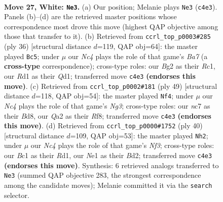 \documentclass[11pt]{article}
\begin{document}
\clearpage

\begin{figure}[p]\centering
\begin{subfigure}{0.46\textwidth}\centering
\resizebox{\linewidth}{!}{%
\newchessgame
\chessboard[
  setfen={1r1q2k1/p1n2rn1/b4bpp/2pp1p2/P1N2P2/1P4P1/Q3P1BP/1RBRN1K1 w - - 10 27},
  showmover=false,
  pgfstyle=straightmove, color=movearrow, markmove={c4-e3}
]}
\caption{}
\end{subfigure}\hfill
\begin{subfigure}{0.46\textwidth}\centering
\resizebox{\linewidth}{!}{%
\newchessgame
\chessboard[
  setfen={r2qr1k1/Bpp2pp1/3b1n1p/p4b2/N7/P5P1/1P2PPBP/2RQR1K1 w - - 10 19},
  showmover=false,
  pgfstyle=straightmove, color=movearrow, markmove={a7-c5}
]}
\caption{}
\end{subfigure}
\\[4pt]
\begin{subfigure}{0.46\textwidth}\centering
\resizebox{\linewidth}{!}{%
\newchessgame
\chessboard[
  setfen={3b1rk1/rb2qppp/3p2n1/1p2p3/4P3/PB1PN2P/R2B1PP1/3QR1K1 b - - 7 25},
  showmover=false,
  pgfstyle=straightmove, color=movearrow, markmove={g6-f4}
]}
\caption{}
\end{subfigure}\hfill
\begin{subfigure}{0.46\textwidth}\centering
\resizebox{\linewidth}{!}{%
\newchessgame
\chessboard[
  setfen={1rq1r1k1/1bpn1pp1/5b1p/p2P4/P1P1p2P/5NP1/R2BQPB1/3R2K1 w - - 0 21},
  showmover=false,
  pgfstyle=straightmove, color=movearrow, markmove={f3-h2}
]}
\caption{}
\end{subfigure}
\caption{\textbf{Move 27, White: \texttt{Ne3}.} (a) Our position; Melanie plays \texttt{Ne3} (\texttt{c4e3}). Panels (b)--(d) are the retrieved master positions whose correspondence most drove this move (highest QAP objective among those that transfer to it). (b) Retrieved from \texttt{ccrl\_top\_p0003\#285} (ply 36) [structural distance $d$=119, QAP obj=64]: the master played \texttt{Bc5}; under $\mu$ our \emph{Nc4} plays the role of that game's \emph{Ba7} (a \textbf{cross-type} correspondence); cross-type roles: our \emph{B}g2 as their \emph{R}c1, our \emph{R}d1 as their \emph{Q}d1; transferred move \texttt{c4e3} \textbf{(endorses this move)}. (c) Retrieved from \texttt{ccrl\_top\_p0002\#181} (ply 49) [structural distance $d$=118, QAP obj=54]: the master played \texttt{Nf4}; under $\mu$ our \emph{Nc4} plays the role of that game's \emph{Ng3}; cross-type roles: our \emph{n}c7 as their \emph{B}d8, our \emph{Q}a2 as their \emph{R}f8; transferred move \texttt{c4e3} \textbf{(endorses this move)}. (d) Retrieved from \texttt{ccrl\_top\_p0000\#1752} (ply 40) [structural distance $d$=109, QAP obj=53]: the master played \texttt{Nh2}; under $\mu$ our \emph{Nc4} plays the role of that game's \emph{Nf3}; cross-type roles: our \emph{B}c1 as their \emph{R}d1, our \emph{N}e1 as their \emph{B}d2; transferred move \texttt{c4e3} \textbf{(endorses this move)}. Synthesis: 6 retrieved analogs transferred to \texttt{Ne3} (summed QAP objective 283, the strongest correspondence among the candidate moves); Melanie committed it via the \texttt{search} selector.}
\label{fig:thought-m52}
\end{figure}
\end{document}
